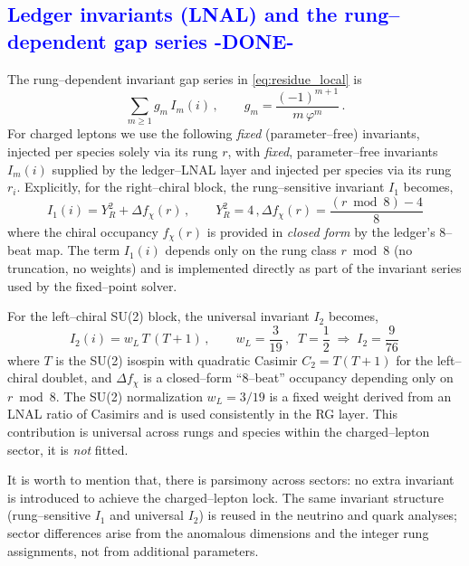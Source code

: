 \documentclass[%
 amsmath,amssymb,
 aps,
prb,
floatfix, showkeys
]{revtex4-2}
\newcommand{\modif}[1]{\textcolor{blue}{#1}}
\begin{document}
{\modif{
\subsection{Ledger invariants (LNAL) and the rung–dependent gap series  -DONE-}
\label{subsec:ledger-invariants}
}}
The rung--dependent invariant gap series in \eqref{eq:residue_local} is
\begin{equation}
  \sum_{m\ge 1} g_m\,I_m(i)\,,\qquad g_m=\frac{(-1)^{m+1}}{m\,\varphi^{m}}\,.
  \label{eq:gap_series}
\end{equation}
For charged leptons we use the following \emph{fixed} (parameter–free) invariants,
injected per species solely via its rung $r$, with \emph{fixed}, parameter--free
invariants $I_m(i)$ supplied by the ledger--LNAL layer and injected per species via
its rung $r_i$. Explicitly, for the right--chiral block, the rung--sensitive 
invariant $I_1$  becomes,
\begin{equation}
  I_1(i) =  Y_R^2  + \Delta f_\chi(r) \, , \qquad Y_R^2 = 4  \,,
  \Delta f_\chi(r) = \frac{(r\bmod 8) - 4}{8} 
  \label{eq:I1_def}
\end{equation}
where the chiral occupancy $f_\chi(r)$ is provided in \emph{closed form}
by the ledger’s 8--beat map.
The term  $I_1(i)$ depends only on the rung class $r\bmod 8$
(no truncation, no weights) and is implemented directly as part of
the invariant series used by the fixed--point solver.


For the left--chiral SU(2) block, the universal invariant $I_2$ becomes, 
\begin{equation}
  I_2(i)  = w_L\,T\,(T+1) \, ,  \qquad w_L=\frac{3}{19}\,,\;\;
  T=\frac{1}{2}\;\Rightarrow\; I_2=\frac{9}{76}\,
\label{eq:I2_def}
\end{equation}
where  $T$ is the SU(2) isospin with quadratic Casimir $C_2 = T(T+1)$ for the
left–chiral doublet, and $\Delta f_\chi$ is a closed–form ``8–beat''
occupancy depending only on $r\bmod 8$. The SU(2) normalization $w_L=3/19$
is a fixed weight derived from an LNAL ratio of Casimirs and is used consistently
in the RG layer.
This contribution is universal across rungs and species within the charged--lepton sector,
 it is \emph{not} fitted.

 It is worth to mention that, there is parsimony across sectors: no extra invariant
 is introduced to achieve the charged--lepton lock. The same invariant structure
 (rung--sensitive $I_1$ and universal $I_2$) is reused in the neutrino and quark analyses;
 sector differences arise from the anomalous dimensions and the integer rung assignments,
 not from additional parameters.
\end{document}
